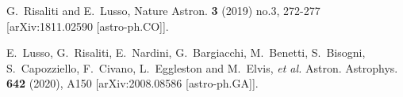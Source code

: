 \documentclass[aps,prl,10pt,twocolumn,superscriptaddress]{revtex4}
\begin{document}
\begin{thebibliography}{99}
G.~Risaliti and E.~Lusso,
Nature Astron. \textbf{3} (2019) no.3, 272-277
[arXiv:1811.02590 [astro-ph.CO]].

E.~Lusso, G.~Risaliti, E.~Nardini, G.~Bargiacchi, M.~Benetti, S.~Bisogni, S.~Capozziello, F.~Civano, L.~Eggleston and M.~Elvis, \textit{et al.}
Astron. Astrophys. \textbf{642} (2020), A150
[arXiv:2008.08586 [astro-ph.GA]].



\end{thebibliography}
\end{document}
